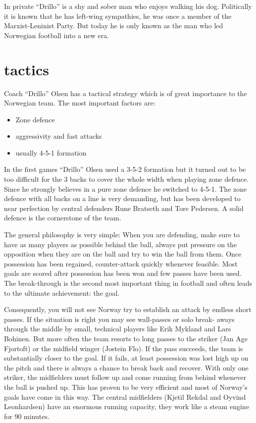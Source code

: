 In private ``Drillo'' is a shy and sober man who enjoys walking his dog. 
Politically it is known that he has left-wing sympathies, he was once a member 
of the Marxist-Leninist Party. But today he is only known as the man who led 
Norwegian football into a new era.
\section{tactics}
Coach ``Drillo'' Olsen has a tactical strategy which is of great importance to 
the Norwegian team. The most important factors are:
\begin{itemize}
\item Zone defence
\item aggressivity and fast attacks
\item usually 4-5-1 formation
\end{itemize}
In the first games ``Drillo'' Olsen used a 3-5-2 formation but it turned out to 
be too difficult for the 3 backs to cover the whole width when playing zone 
defence. Since he strongly believes in a pure zone defence he switched to 4-5-1. 
The zone defence with all backs on a line is very demanding, but has been 
developed to near perfection by central defenders Rune Bratseth and Tore 
Pedersen. A solid defence is the cornerstone of the team.

The general philosophy is very simple: When you are defending, make sure to 
have as many players as possible behind the ball, always put pressure on the 
opposition when they are on the ball and try to win the ball from them. Once
possession has been regained, counter-attack quickly whenever feasible. Most 
goals are scored after possession has been won and few passes have been used. 
The break-through is the second most important thing in football and often leads 
to the ultimate achievement: the goal.

Consequently, you will not see Norway try to establish an attack by endless 
short passes. If the situation is right you may see wall-passes or solo break-
aways through the middle by small, technical players like Erik Mykland and 
Lars Bohinen. But more often the team resorts to long passes to the striker 
(Jan Age Fjortoft) or the midfield winger (Jostein Flo). If the pass succeeds, 
the team is substantially closer to the goal. If it fails, at least possession 
was lost high up on the pitch and there is always a chance to break back and 
recover. With only one striker, the midfielders must follow up and come running
from behind whenever the ball is pushed up. This has proven to be very efficient
and most of Norway's goals have come in this way. The central midfielders 
(Kjetil Rekdal and Oyvind Leonhardsen) have an enormous running capacity, they 
work like a steam engine for 90 minutes.

